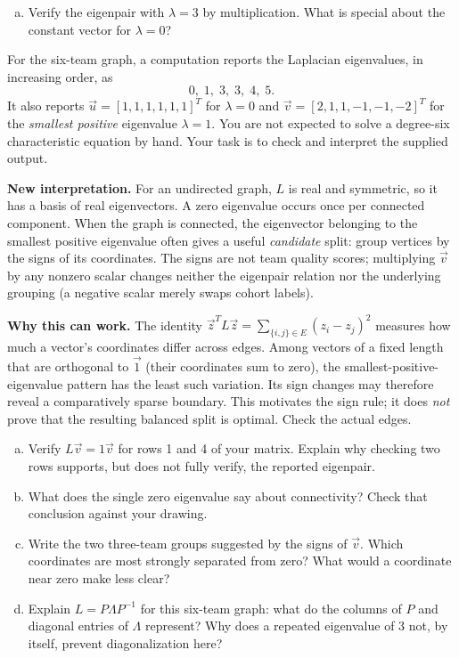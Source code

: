 \documentclass[10pt,letterpaper]{article}
\begin{document}
\begin{enumerate}[a.,leftmargin=*]
\item Verify the eigenpair with $\lambda=3$ by multiplication. What is special about the constant vector for $\lambda=0$?\\[0.55in]
\end{enumerate}

For the six-team graph, a computation reports the Laplacian eigenvalues, in increasing order, as
\[
0,\;1,\;3,\;3,\;4,\;5.
\]
It also reports $\vec u=[1,1,1,1,1,1]^T$ for $\lambda=0$ and $\vec v=[2,1,1,-1,-1,-2]^T$ for the \emph{smallest positive} eigenvalue $\lambda=1$. You are not expected to solve a degree-six characteristic equation by hand. Your task is to check and interpret the supplied output.

\textbf{New interpretation.} For an undirected graph, $L$ is real and symmetric, so it has a basis of real eigenvectors. A zero eigenvalue occurs once per connected component. When the graph is connected, the eigenvector belonging to the smallest positive eigenvalue often gives a useful \emph{candidate} split: group vertices by the signs of its coordinates. The signs are not team quality scores; multiplying $\vec v$ by any nonzero scalar changes neither the eigenpair relation nor the underlying grouping (a negative scalar merely swaps cohort labels).

\textbf{Why this can work.} The identity $\vec z^TL\vec z=\sum_{\{i,j\}\in E}(z_i-z_j)^2$ measures how much a vector's coordinates differ across edges. Among vectors of a fixed length that are orthogonal to $\vec 1$ (their coordinates sum to zero), the smallest-positive-eigenvalue pattern has the least such variation. Its sign changes may therefore reveal a comparatively sparse boundary. This motivates the sign rule; it does \emph{not} prove that the resulting balanced split is optimal. Check the actual edges.

\begin{enumerate}[b.,leftmargin=*]
\item Verify $L\vec v=1\vec v$ for rows 1 and 4 of your matrix. Explain why checking two rows supports, but does not fully verify, the reported eigenpair.\\[0.63in]
\item What does the single zero eigenvalue say about connectivity? Check that conclusion against your drawing.\\[0.42in]
\item Write the two three-team groups suggested by the signs of $\vec v$. Which coordinates are most strongly separated from zero? What would a coordinate near zero make less clear?\\[0.65in]
\item Explain $L=P\Lambda P^{-1}$ for this six-team graph: what do the columns of $P$ and diagonal entries of $\Lambda$ represent? Why does a repeated eigenvalue of $3$ not, by itself, prevent diagonalization here?\\[0.62in]
\end{enumerate}
\end{document}
